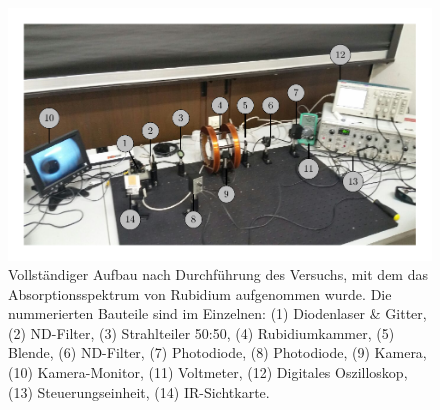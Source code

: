 \FloatBarrier
\begin{figure}[!h]
\centering
\includegraphics[scale=1]{../Grafiken/Diodenlaser_Aufbau_Nr.pdf}
\caption{Vollständiger Aufbau nach Durchführung des Versuchs, mit dem das Absorptionsspektrum von 
	Rubidium aufgenommen wurde. Die nummerierten Bauteile sind im Einzelnen:
	(1) Diodenlaser \& Gitter, (2) ND-Filter, (3) Strahlteiler 50:50, (4) Rubidiumkammer,
	(5) Blende, (6) ND-Filter, (7) Photodiode, (8) Photodiode, (9) Kamera, (10) Kamera-Monitor,
	(11) Voltmeter, (12) Digitales Oszilloskop, (13) Steuerungseinheit, (14) IR-Sichtkarte.
	\label{fig:diodenlaser_aufbau_nr}}
\end{figure}
\FloatBarrier